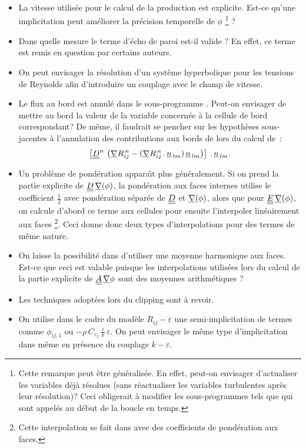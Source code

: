\begin{itemize}
\item {La vitesse utilisée pour le calcul de la production est explicite. Est-ce qu'une implicitation peut améliorer la précision temporelle de $\phi$ \footnote{Cette remarque peut être généralisée. En effet, peut-on envisager d'actualiser les variables déjà résolues (sans réactualiser les variables turbulentes après leur résolution)? Ceci obligerait à modifier les sous-programmes tels que  qui sont appelés au début de la boucle en temps.} ?}
\item {Dans quelle mesure le terme d'écho de paroi est-il valide ? En effet, ce terme est remis en question par certains auteurs.}
\item {On peut envisager la résolution d'un système hyperbolique pour les
tensions de Reynolds afin d'introduire un couplage avec le champ de vitesse.}
\item {Le flux au bord  est annulé dans le sous-programme
. Peut-on envisager de mettre au bord la valeur de la variable
concernée à la cellule de bord correspondant? De même, il faudrait se
pencher sur les hypothèses sous-jacentes à l'annulation des contributions
aux bords de  lors du calcul de~: $$\left[ \underline{\underline{D}}^n\,\left( \underline{\nabla}{R^{\,n}_{ij}} - (\underline{\nabla} R^{\,n}_{ij}\,.\,\underline{n}_{\,lm})\,\underline{n}_{\,lm}\right) \right]\,.\,\underline{n}_{\,lm}.$$}
\item {Un problème de pondération appara\^\i t plus généralement. Si on prend la partie explicite de $\underline{\underline{D}}\,\underline{\nabla}(\phi)$, la pondération aux faces internes utilise le coefficient $\displaystyle\frac{1}{2}$ avec pondération séparée de $\underline{\underline{D}}$ et $\underline{\nabla}(\phi)$, alors que pour $\underline{\underline{E}}\,\underline{\nabla}(\phi)$, on calcule d'abord ce terme aux cellules pour ensuite l'interpoler linéairement aux faces \footnote{Cette interpolation se fait dans  avec des coefficients de pondération aux faces.}. Ceci donne donc deux types d'interpolations pour des termes de même nature.}
\item {On laisse la possibilité dans  d'utiliser une moyenne
harmonique aux faces. Est-ce que ceci est valable puisque les interpolations
utilisées lors du calcul de la partie explicite de $\underline{\underline{A}}\,\underline{\nabla}{\phi}$
sont des moyennes arithmétiques ?}
\item {Les techniques adoptées lors du clipping sont à revoir.}
\item {On utilise dans le cadre du modèle $\displaystyle R_{ij}-\varepsilon $ une semi-implicitation de termes comme $\displaystyle \phi_{ij,1}$ ou $\displaystyle -\rho\,C_{\varepsilon_2}\,\frac{\varepsilon}{k}\,\varepsilon$. On peut envisager le même type d'implicitation dans  même en présence du couplage $\displaystyle k-\varepsilon$.}

\end{itemize}
